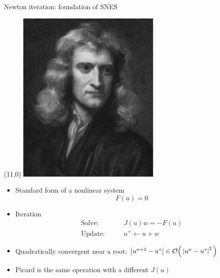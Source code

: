\begin{frame}{Newton iteration: foundation of SNES}
  \begin{textblock}{3}(11,0)
    \includegraphics[width=\textwidth]{figures/Newton}
  \end{textblock}
  \begin{itemize}
  \item Standard form of a nonlinear system
    \[ F(u) = 0 \]
  \item Iteration
    \begin{align*}
      \text{Solve:} & \qquad J(u) w = -F(u) \\
      \text{Update:} & \qquad u^+ \gets u + w
    \end{align*}
    \item Quadratically convergent near a root: $\left\lvert u^{n+1}-u^* \right\rvert \in \mathcal{O}\Big(\left\lvert u^n-u^* \right\rvert^2\Big)$
    \item Picard is the same operation with a different $J(u)$
  \end{itemize}
  \begin{example}
    \begin{align*}

\end{align*}
\end{example}
\end{frame}
